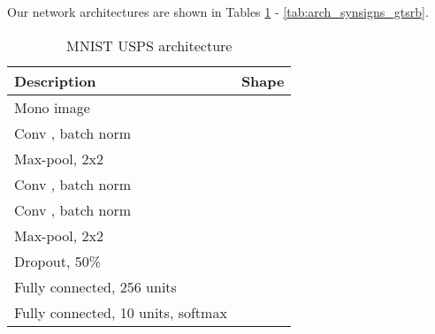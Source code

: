 \documentclass{article}
\begin{document}
Our network architectures are shown in Tables \ref{tab:arch_mnist_usps} - \ref{tab:arch_synsigns_gtsrb}.

\begin{table}[h!t]
\footnotesize
\begin{center}
\begin{tabular}{|ll|}
\hline
\multicolumn{1}{|l|}{Description} &
Shape \\
\hline
 Mono image                       &      \\
Conv , batch norm         &     \\
Max-pool, 2x2                                   &     \\

Conv , batch norm         &     \\
Conv , batch norm         &       \\
Max-pool, 2x2                                   &       \\

Dropout, 50\%                                   &       \\

Fully connected, 256 units                      &                        \\
Fully connected, 10 units, softmax              &                        \\

\hline
\end{tabular}
\caption{MNIST  USPS architecture}
\label{tab:arch_mnist_usps}
\end{center}
\end{table}
\end{document}
